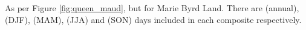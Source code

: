 \label{fig:marie_byrd}
As per Figure \ref{fig:queen_maud}, but for Marie Byrd Land. There are (annual),  (DJF),  (MAM),  (JJA) and  (SON) days included in each composite respectively.